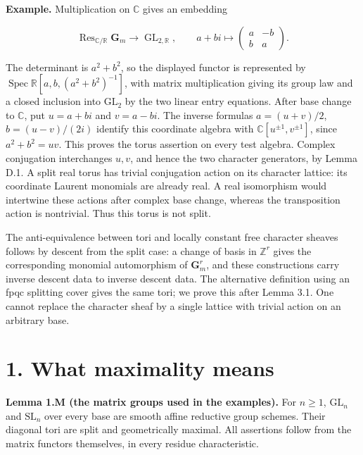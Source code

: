 \documentclass[11pt,a4paper,openany]{report}
\begin{document}
\textbf{Example.} Multiplication on \(\mathbb C\) gives an embedding

\[
\operatorname{Res}_{\mathbb C/\mathbb R}\mathbf G_m\longrightarrow\operatorname{GL}_{2,\mathbb R},\qquad
a+bi\longmapsto\begin{pmatrix}a&-b\\b&a\end{pmatrix}.
\]

The determinant is \(a^2+b^2\), so the displayed functor is represented by \(\operatorname{Spec}\mathbb R[a,b,(a^2+b^2)^{-1}]\), with matrix multiplication giving its group law and a closed inclusion into \(\mathrm{GL}_2\) by the two linear entry equations. After base change to \(\mathbb C\), put \(u=a+bi\) and \(v=a-bi\). The inverse formulas \(a=(u+v)/2\), \(b=(u-v)/(2i)\) identify this coordinate algebra with \(\mathbb C[u^{\pm1},v^{\pm1}]\), since \(a^2+b^2=uv\). This proves the torus assertion on every test algebra. Complex conjugation interchanges \(u,v\), and hence the two character generators, by Lemma D.1. A split real torus has trivial conjugation action on its character lattice: its coordinate Laurent monomials are already real. A real isomorphism would intertwine these actions after complex base change, whereas the transposition action is nontrivial. Thus this torus is not split.

The anti-equivalence between tori and locally constant free character sheaves follows by descent from the split case: a change of basis in \(\mathbb Z^r\) gives the corresponding monomial automorphism of \(\mathbf G_m^r\), and these constructions carry inverse descent data to inverse descent data. The alternative definition using an fpqc splitting cover gives the same tori; we prove this after Lemma 3.1. One cannot replace the character sheaf by a single lattice with trivial action on an arbitrary base.

\section{1. What maximality means}\label{AG-RG-01-what-maximality-means}

\textbf{Lemma 1.M (the matrix groups used in the examples).} For \(n\ge1\), \(\mathrm{GL}_n\) and \(\mathrm{SL}_n\) over every base are smooth affine reductive group schemes. Their diagonal tori are split and geometrically maximal. All assertions follow from the matrix functors themselves, in every residue characteristic.
\end{document}
